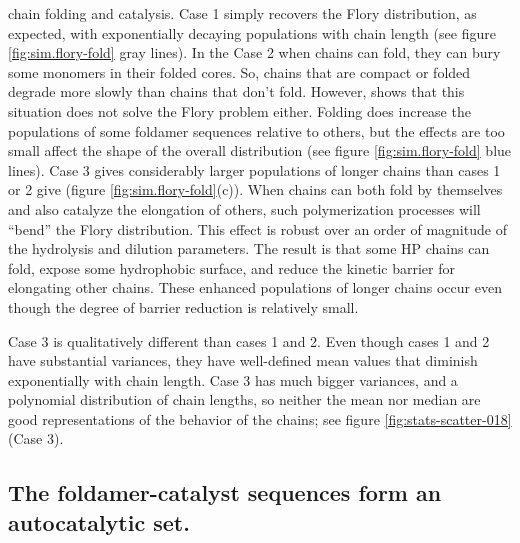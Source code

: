 \documentclass[5p,times]{elsarticle}
\begin{document}
chain 
folding and catalysis.  Case  1 simply recovers the Flory distribution, as expected, with 
exponentially decaying populations with chain 
length (see figure \ref{fig:sim.flory-fold} gray lines).  In the Case 2 when chains can fold, they 
can bury some monomers in their folded cores.  So, chains that are compact or folded degrade more 
slowly than chains that don't fold.  However, 
shows that this situation does not solve the Flory problem either.  Folding does increase the 
populations of some foldamer sequences relative to others, but the effects are too small affect 
the 
shape of the overall distribution (see figure \ref{fig:sim.flory-fold} blue lines).  
Case 3 gives considerably larger populations of longer chains than cases 1 or 2 give (figure 
\ref{fig:sim.flory-fold}(c)).  When chains 
can both fold by themselves and also catalyze the elongation of others, such polymerization 
processes will ``bend'' the Flory distribution.  This effect is robust over an order of 
magnitude of the hydrolysis and dilution parameters.  The result is that some HP chains can fold, 
expose some hydrophobic surface, and reduce the kinetic barrier for elongating other chains.  
These 
enhanced populations of longer chains occur even though the degree of barrier reduction is 
relatively small.

Case 3 is qualitatively different than cases 1 and 2.  Even though cases 1 and 2 have substantial 
variances, they have well-defined mean values that diminish exponentially with chain length.  Case 
3 has much bigger variances, and a polynomial distribution of chain lengths, so neither the mean 
nor median are good representations of the behavior of the chains; see figure 
\ref{fig:stats-scatter-018}(Case 3).

\subsection{The foldamer-catalyst sequences form an autocatalytic set.}
\end{document}
